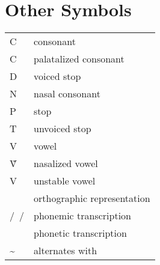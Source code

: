 \section*{Other Symbols}
\begin{longtabu} {YY[2.5]}
	C 		& consonant\\
	C	& palatalized consonant\\
	D 		& voiced stop\\
	N 		& nasal consonant\\
	P 		& stop\\
	T 		& unvoiced stop\\
	V		& vowel\\
	Ṽ	 	& nasalized vowel\\
	V& unstable vowel\\
	\orth{~}& orthographic representation\\
	/~/		& phonemic transcription\\
	\nt{ }	& phonetic transcription\\
	\sim	& alternates with\\
\end{longtabu}
\fi